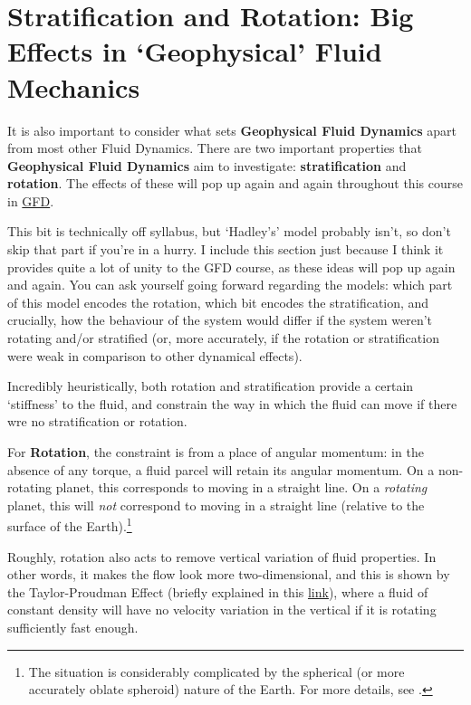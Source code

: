 \section{Stratification and Rotation: Big Effects in `Geophysical' Fluid Mechanics}\label{GFD Special}

It is also important to consider what sets \textbf{Geophysical Fluid Dynamics} apart from most other Fluid Dynamics. There are two important properties that \textbf{Geophysical Fluid Dynamics} aim to investigate: \textbf{stratification} and \textbf{rotation}. The effects of these will pop up again and again throughout this course in \hyperref[Geophysical Fluid Dynamics]{GFD}.

This bit is technically off syllabus, but `Hadley's' model probably isn't, so don't skip that part if you're in a hurry. I include this section just because I think it provides quite a lot of unity to the GFD course, as these ideas will pop up again and again. You can ask yourself going forward regarding the models: which part of this model encodes the rotation, which bit encodes the stratification, and crucially, how the behaviour of the system would differ if the system weren't rotating and/or stratified (or, more accurately, if the rotation or stratification were weak in comparison to other dynamical effects).

Incredibly heuristically, both rotation and stratification provide a certain `stiffness' to the fluid, and constrain the way in which the fluid can move if there wre no stratification or rotation.

For \textbf{Rotation}, the constraint is from a place of angular momentum: in the absence of any torque, a fluid parcel will retain its angular momentum. On a non-rotating planet, this corresponds to moving in a straight line. On a \textit{rotating} planet, this will \textit{not} correspond to moving in a straight line (relative to the surface of the Earth).\footnote{
    The situation is considerably complicated by the spherical (or more accurately oblate spheroid) nature of the Earth. For more details, see \cite{Andy_Coriolis_Optical_Illusion}.
}

Roughly, rotation also acts to remove vertical variation of fluid properties. In other words, it makes the flow look more two-dimensional, and this is shown by the Taylor-Proudman Effect (briefly explained in this \href{https://www.physics.ox.ac.uk/research/group/geophysical-and-astrophysical-fluid-dynamics/tutorials/0}{link}), where a fluid of constant density will have no velocity variation in the vertical if it is rotating sufficiently fast enough.

